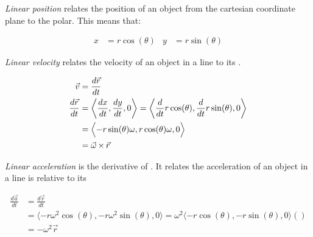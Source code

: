 \begin{definition} \label{def:Linear Position}
  \emph{Linear position} relates the position of an object from the cartesian coordinate plane to the polar.
  This means that:

  \begin{equation} \label{eq:Linear Position}
    \begin{aligned}
      x &= r \cos ( \theta ) & y &= r \sin ( \theta )
    \end{aligned}
  \end{equation}
\end{definition}

\begin{definition} \label{def:Linear Velocity}
  \emph{Linear velocity} relates the velocity of an object in a line to its .

  \begin{equation} \label{eq:Linear Velocity}
    \begin{aligned}
      \vec{v} &= \frac{d \vec{r}}{dt} \\
      \frac{d \vec{r}}{dt} &= \biggl \langle \frac{dx}{dt}, \frac{dy}{dt}, 0 \biggr \rangle = \biggl \langle \frac{d}{dt} r \cos ( \theta ), \frac{d}{dt} r \sin ( \theta ), 0 \biggr \rangle \\
      &= \Bigl \langle -r \sin ( \theta ) \omega, r \cos ( \theta ) \omega, 0 \Bigr \rangle \\
      &= \vec{\omega} \operatorname{\times} \vec{r}
    \end{aligned}
  \end{equation}
\end{definition}

\begin{definition} \label{def:Linear Acceleration}
  \emph{Linear acceleration} is the derivative of .
  It relates the acceleration of an object in a line is relative to its 

  \begin{equation} \label{eq:Linear Acceleration}
    \begin{aligned}
      \frac{d \vec{a}}{dt} &= \frac{d \vec{v}}{dt} \\
      &= \langle -r \omega^{2} \cos ( \theta ), -r \omega^{2} \sin ( \theta ), 0 \rangle = \omega^{2} \langle -r \cos ( \theta ), -r \sin ( \theta ), 0 \rangle \left( \right) \\
      &= - \omega^{2} \vec{r}
    \end{aligned}
  \end{equation}
\end{definition}
